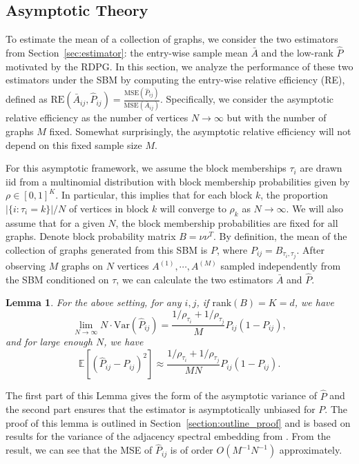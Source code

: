 \documentclass[10pt,letterpaper]{article}
\newtheorem{lemma}[fact]{Lemma}
\newcommand{\Ex}{\mathbb{E}}
\renewcommand{\hat}{\widehat}
\begin{document}
\subsection{Asymptotic Theory}
\label{section:theoretical_result}
To estimate the mean of a collection of graphs, we consider the two estimators from Section~\ref{sec:estimator}: the entry-wise sample mean $\bar{A}$ and the low-rank $\hat{P}$ motivated by the RDPG.
In this section, we analyze the performance of these two estimators under the SBM by computing the entry-wise relative efficiency (RE), defined as $\mathrm{RE}(\bar{A}_{ij}, \hat{P}_{ij}) = \frac{\mathrm{MSE}(\hat{P}_{ij})}{\mathrm{MSE}(\bar{A}_{ij})}$.
Specifically, we consider the asymptotic relative efficiency as the number of vertices $N\to\infty$ but with the number of graphs $M$ fixed.
Somewhat surprisingly, the asymptotic relative efficiency will not depend on this fixed sample size $M$.

For this asymptotic framework, we assume the block memberships $\tau_i$ are drawn iid from a multinomial distribution with block membership probabilities given by $\rho\in[0,1]^K$.
In particular, this implies that for each block $k$, the proportion $|\{i:\tau_i=k\}|/N$ of vertices in block $k$ will converge to $\rho_k$ as $N\to\infty$.
We will also assume that for a given $N$, the block membership probabilities are fixed for all graphs.
Denote block probability matrix $B = \nu \nu^T$. 
By definition, the mean of the collection of graphs generated from this SBM is $P$, where $P_{ij} = B_{\tau_i, \tau_j}$. After observing $M$ graphs on $N$ vertices $A^{(1)}, \cdots, A^{(M)}$ sampled independently from the SBM conditioned on $\tau$, we can calculate the two estimators $\bar{A}$ and $\hat{P}$.

\begin{lemma}
\label{lm:VarPhat}
For the above setting, for any $i, j$, if $\mathrm{rank}(B)=K=d$, we have
\[
    \lim_{N \to \infty} N \cdot \mathrm{Var}(\hat{P}_{ij}) =
    \frac{1/\rho_{\tau_i} + 1/\rho_{\tau_j}}{M} P_{ij} (1 - P_{ij}),
\]
and for large enough $N$, we have
\[
    \Ex[(\hat{P}_{ij} - P_{ij})^2] \approx
    \frac{1/\rho_{\tau_i} + 1/\rho_{\tau_j}}{M N} P_{ij}(1-P_{ij}).
\]
\end{lemma}
The first part of this Lemma gives the form of the asymptotic variance of $\hat{P}$ and the second part ensures that the estimator is asymptotically unbiased for $P$.
The proof of this lemma is outlined in Section~\ref{section:outline_proof} and is based on results for the variance of the adjacency spectral embedding from \citet{athreya2013limit}. From the result, we can see that the MSE of $\hat{P}_{ij}$ is of order $O(M^{-1}N^{-1})$ approximately.
\end{document}
